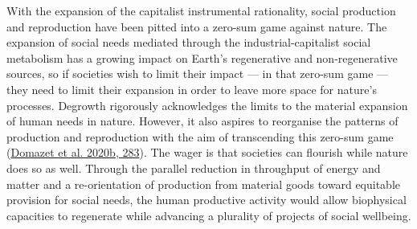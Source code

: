 \documentclass[a4paper, nobind]{templates/ociamthesis}
\begin{document}
With the expansion of the capitalist instrumental rationality, social production and reproduction have been pitted into a zero-sum game against nature. The expansion of social needs mediated through the industrial-capitalist social metabolism has a growing impact on Earth's regenerative and non-regenerative sources, so if societies wish to limit their impact --- in that zero-sum game --- they need to limit their expansion in order to leave more space for nature's processes. Degrowth rigorously acknowledges the limits to the material expansion of human needs in nature. However, it also aspires to reorganise the patterns of production and reproduction with the aim of transcending this zero-sum game (\protect\hyperlink{ref-domazet_mental_2020}{Domazet et al. 2020b, 283}). The wager is that societies can flourish while nature does so as well. Through the parallel reduction in throughput of energy and matter and a re-orientation of production from material goods toward equitable provision for social needs, the human productive activity would allow biophysical capacities to regenerate while advancing a plurality of projects of social wellbeing.
\end{document}
